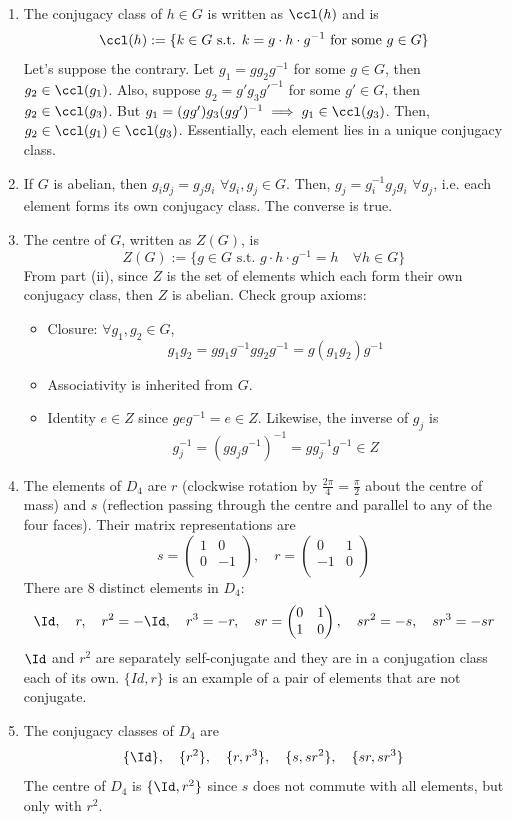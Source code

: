\documentclass[a4paper]{article}
\begin{document}
\begin{ans}\leavevmode
\begin{enumerate}[label=(\roman*)]
\item The conjugacy class of $h\in G$ is written as $\ccl(h)$ and is
$$\ccl(h):=\{k\in G\text{ s.t. }k=g\cdot h\cdot g^{-1}\text{ for some }g\in G\}$$
Let's suppose the contrary. Let $g_1=gg_2g^{-1}$ for some $g\in G$, then $g_2\in\ccl(g_1)$. Also, suppose $g_2=g'g_3g'^{-1}$ for some $g'\in G$, then $g_2\in\ccl(g_3)$. But $g_1=(gg')g_3(gg')^{-1}\implies g_1\in\ccl(g_3)$. Then, $g_2\in\ccl(g_1)\in\ccl(g_3)$. Essentially, each element lies in a unique conjugacy class.
\item If $G$ is abelian, then $g_ig_j=g_jg_i$ $\forall g_i,g_j\in G$. Then, $g_j=g_i^{-1}g_jg_i$ $\forall g_j$, i.e. each element forms its own conjugacy class. The converse is true.
\item The centre of $G$, written as $Z(G)$, is
$$Z(G):=\{g\in G\text{ s.t. }g\cdot h\cdot g^{-1}=h\quad \forall h\in G\}$$
From part (ii), since $Z$ is the set of elements which each form their own conjugacy class, then $Z$ is abelian. Check group axioms:
\begin{itemize}
\item Closure: $\forall g_1,g_2\in G$,
$$g_1g_2=gg_1g^{-1}gg_2g^{-1}=g(g_1g_2)g^{-1}$$
\item Associativity is inherited from $G$. \item Identity $e\in Z$ since $geg^{-1}=e\in Z$. Likewise, the inverse of $g_j$ is
$$g_j^{-1}=(gg_jg^{-1})^{-1}=gg_j^{-1}g^{-1}\in Z$$
\end{itemize}
\item The elements of $D_4$ are $r$ (clockwise rotation by $\frac{2\pi}{4}=\frac{\pi}{2}$ about the centre of mass) and $s$ (reflection passing through the centre and parallel to any of the four faces). Their matrix representations are
$$s=\begin{pmatrix}1&0\\0&-1\\\end{pmatrix},\quad r=\begin{pmatrix}0&1\\-1&0\\\end{pmatrix}$$
There are 8 distinct elements in $D_4$:
$$\Id,\quad r,\quad r^2=-\Id,\quad r^3=-r,\quad sr=\begin{pmatrix}0&1\\1&0\\\end{pmatrix},\quad sr^2=-s,\quad sr^3=-sr$$
$\Id$ and $r^2$ are separately self-conjugate and they are in a conjugation class each of its own. $\{Id,r\}$ is an example of a pair of elements that are not conjugate.
\item The conjugacy classes of $D_4$ are
$$\{\Id\},\quad \{r^2\},\quad \{r,r^3\},\quad\{s,sr^2\},\quad\{sr,sr^3\}$$
The centre of $D_4$ is $\{\Id,r^2\}$ since $s$ does not commute with all elements, but only with $r^2$.
\end{enumerate}
\end{ans}
\end{document}
